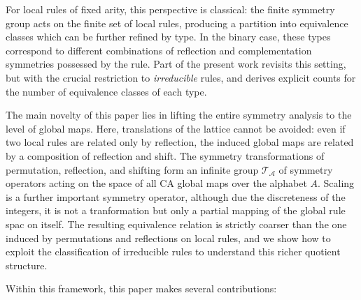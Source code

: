 \documentclass[a4paper]{article}
\begin{document}
For local rules of fixed arity, this perspective is classical: the finite symmetry
group acts on the finite set of local rules, producing a partition into
equivalence classes which can be further refined by type. In the binary case,
these types correspond to different combinations of reflection and complementation
symmetries possessed by the rule. Part of the present work revisits this
setting, but with the crucial restriction to \emph{irreducible} rules, and derives
explicit counts for the number of equivalence classes of each type.

The main novelty of this paper lies in lifting the entire symmetry analysis to
the level of global maps. Here, translations of the lattice cannot be avoided:
even if two local rules are related only by reflection, the induced global maps
are related by a composition of reflection and shift.
The symmetry transformations of permutation, reflection, and shifting form
an infinite group $\mathcal{T}_{\mathcal{A}}$ of symmetry operators acting
on the space of all CA global maps over the alphabet $A$.
Scaling is a further important symmetry operator, although due the discreteness of
the integers, it is not a tranformation but only a partial mapping of the global rule
spac on itself.
The resulting
equivalence relation is strictly coarser than the one induced by permutations and
reflections on local rules, and we show how to exploit the classification of
irreducible rules to understand this richer quotient structure.

Within this framework, this paper makes several contributions:
\end{document}
